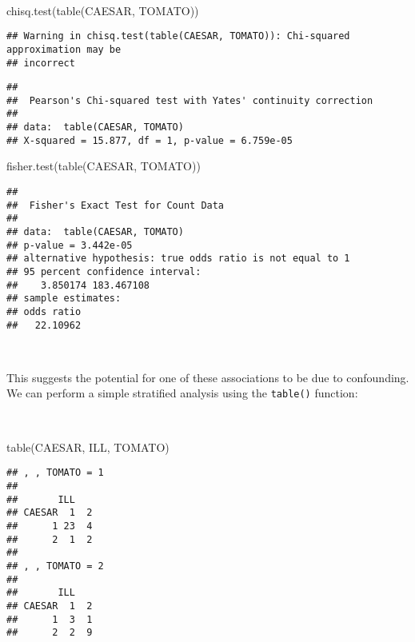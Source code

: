 \documentclass[
  12pt,
  a4paper]{book}
\newenvironment{Shaded}{\begin{snugshade}}{\end{snugshade}}
\newcommand{\FunctionTok}[1]{\textcolor[rgb]{0.00,0.00,0.00}{#1}}
\newcommand{\NormalTok}[1]{#1}
\begin{document}
~

\begin{Shaded}
\begin{Highlighting}[]
\FunctionTok{chisq.test}\NormalTok{(}\FunctionTok{table}\NormalTok{(CAESAR, TOMATO))}
\end{Highlighting}
\end{Shaded}

\begin{verbatim}
## Warning in chisq.test(table(CAESAR, TOMATO)): Chi-squared approximation may be
## incorrect
\end{verbatim}

\begin{verbatim}
## 
##  Pearson's Chi-squared test with Yates' continuity correction
## 
## data:  table(CAESAR, TOMATO)
## X-squared = 15.877, df = 1, p-value = 6.759e-05
\end{verbatim}

\newpage

\begin{Shaded}
\begin{Highlighting}[]
\FunctionTok{fisher.test}\NormalTok{(}\FunctionTok{table}\NormalTok{(CAESAR, TOMATO))}
\end{Highlighting}
\end{Shaded}

\begin{verbatim}
## 
##  Fisher's Exact Test for Count Data
## 
## data:  table(CAESAR, TOMATO)
## p-value = 3.442e-05
## alternative hypothesis: true odds ratio is not equal to 1
## 95 percent confidence interval:
##    3.850174 183.467108
## sample estimates:
## odds ratio 
##   22.10962
\end{verbatim}

~

This suggests the potential for one of these associations to be due to confounding. We can perform a simple stratified analysis using the \texttt{table()} function:

~

\begin{Shaded}
\begin{Highlighting}[]
\FunctionTok{table}\NormalTok{(CAESAR, ILL, TOMATO)}
\end{Highlighting}
\end{Shaded}

\begin{verbatim}
## , , TOMATO = 1
## 
##       ILL
## CAESAR  1  2
##      1 23  4
##      2  1  2
## 
## , , TOMATO = 2
## 
##       ILL
## CAESAR  1  2
##      1  3  1
##      2  2  9
\end{verbatim}
\end{document}
